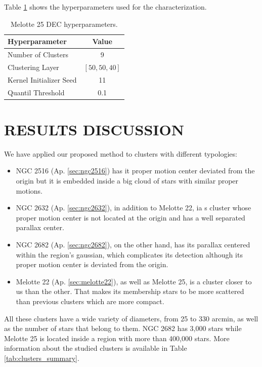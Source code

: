 \documentclass[11pt,a4paper,english,twocolumn]{article}
\begin{document}
Table \ref{tab:hyperparameters_melotte_25} shows the hyperparameters
used for the characterization.

\begin{table}[h]
  \begin{center}
    \begin{tabular}{l|c}
      \textbf{Hyperparameter} & \textbf{Value} \\
      \hline
      Number of Clusters & 9 \\
      Clustering Layer & $\left[ 50, 50, 40 \right]$ \\
      Kernel Initializer Seed & 11 \\
      Quantil Threshold & 0.1 \\
    \end{tabular}
    \caption{Melotte 25 DEC hyperparameters.}
    \label{tab:hyperparameters_melotte_25}
  \end{center}
\end{table}

\section{RESULTS DISCUSSION}

We have applied our proposed method to clusters with different typologies:

\begin{itemize}
  \item NGC 2516 (Ap. \ref{sec:ngc2516}) has it proper motion center deviated from the origin but
        it is embedded inside a big cloud of stars with similar proper motions.
  \item NGC 2632 (Ap. \ref{sec:ngc2632}), in addition to Melotte 22, ia s cluster whose proper motion center
        is not located at the origin and has a well separated parallax center.
  \item NGC 2682 (Ap. \ref{sec:ngc2682}), on the other hand, has its parallax centered within the region's gaussian,
        which complicates its detection although its proper motion center is deviated from the origin.
  \item Melotte 22 (Ap. \ref{sec:melotte22}), as well as Melotte 25, is a cluster closer to us than the other.
        That makes its membership stars to be more scattered than previous clusters which are more compact.
\end{itemize}

All these clusters have a wide variety of diameters, from 25 to 330 arcmin,
as well as the number of stars that belong to them. NGC 2682 has 3,000 stars
while Melotte 25 is located inside a region with more than 400,000 stars.
More information about the studied clusters is available in Table \ref{tab:clusters_summary}.
\end{document}
